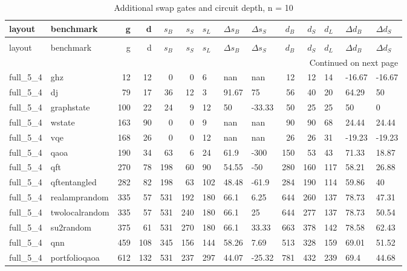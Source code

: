 \begin{longtable}{llrrrrlllrrlll}
\caption{Additional swap gates and circuit depth, n = 10} \label{benchmark-table-10} \\
\toprule
layout & benchmark & g & d & $s_B$ & $s_S$ & $s_L$ & $\Delta s_B$ & $\Delta s_S$ & $d_B$ & $d_S$ & $d_L$ & $\Delta d_B$ & $\Delta d_S$ \\
\midrule
\endfirsthead
\caption[]{Additional swap gates and circuit depth, n = 10} \\
\toprule
layout & benchmark & g & d & $s_B$ & $s_S$ & $s_L$ & $\Delta s_B$ & $\Delta s_S$ & $d_B$ & $d_S$ & $d_L$ & $\Delta d_B$ & $\Delta d_S$ \\
\midrule
\endhead
\midrule
\multicolumn{14}{r}{Continued on next page} \\
\midrule
\endfoot
\bottomrule
\endlastfoot
full\_5\_4 & ghz & 12 & 12 & 0 & 0 & 6 & nan & nan & 12 & 12 & 14 & -16.67 & -16.67 \\
full\_5\_4 & dj & 79 & 17 & 36 & 12 & 3 & 91.67 & 75 & 56 & 40 & 20 & 64.29 & 50 \\
full\_5\_4 & graphstate & 100 & 22 & 24 & 9 & 12 & 50 & -33.33 & 50 & 25 & 25 & 50 & 0 \\
full\_5\_4 & wstate & 163 & 90 & 0 & 0 & 9 & nan & nan & 90 & 90 & 68 & 24.44 & 24.44 \\
full\_5\_4 & vqe & 168 & 26 & 0 & 0 & 12 & nan & nan & 26 & 26 & 31 & -19.23 & -19.23 \\
full\_5\_4 & qaoa & 190 & 34 & 63 & 6 & 24 & 61.9 & -300 & 150 & 53 & 43 & 71.33 & 18.87 \\
full\_5\_4 & qft & 270 & 78 & 198 & 60 & 90 & 54.55 & -50 & 280 & 160 & 117 & 58.21 & 26.88 \\
full\_5\_4 & qftentangled & 282 & 82 & 198 & 63 & 102 & 48.48 & -61.9 & 284 & 190 & 114 & 59.86 & 40 \\
full\_5\_4 & realamprandom & 335 & 57 & 531 & 192 & 180 & 66.1 & 6.25 & 644 & 260 & 137 & 78.73 & 47.31 \\
full\_5\_4 & twolocalrandom & 335 & 57 & 531 & 240 & 180 & 66.1 & 25 & 644 & 277 & 137 & 78.73 & 50.54 \\
full\_5\_4 & su2random & 375 & 61 & 531 & 270 & 180 & 66.1 & 33.33 & 663 & 378 & 142 & 78.58 & 62.43 \\
full\_5\_4 & qnn & 459 & 108 & 345 & 156 & 144 & 58.26 & 7.69 & 513 & 328 & 159 & 69.01 & 51.52 \\
full\_5\_4 & portfolioqaoa & 612 & 132 & 531 & 237 & 297 & 44.07 & -25.32 & 781 & 432 & 239 & 69.4 & 44.68 \\

\end{longtable}
